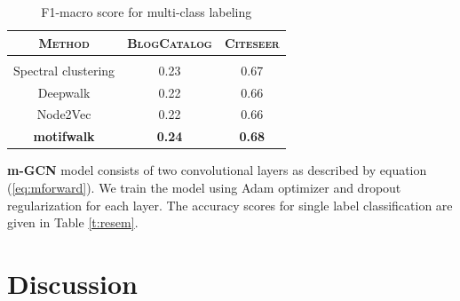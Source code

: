 \documentclass{article}
\theoremstyle{definition}
\begin{document}
\begin{table}
\centering
\begin{tabular}{c | c c}
\textbf{\textsc{Method}} & \textsc{BlogCatalog} & \textsc{Citeseer} \\
\hline \\
Spectral clustering & 0.23 & 0.67\\
Deepwalk & 0.22 & 0.66\\
Node2Vec & 0.22 & 0.66\\
\textbf{motifwalk} & \textbf{0.24} & \textbf{0.68}\\
\end{tabular}%
\caption{F1-macro score for multi-class labeling}
\label{t:re}
\end{table}

\textbf{m-GCN} model consists of two convolutional layers as described by
equation (\ref{eq:mforward}). We train the model using Adam \cite{adam} optimizer
and dropout regularization for each layer. The accuracy scores for single label
classification are given in Table \ref{t:resem}.

\begin{table}
\centering
{}
\setlength{\belowcaptionskip}{-10pt}
\caption{Accuracy score for multi-class labeling}
\label{t:resem}
\end{table}

\section{Discussion}
\end{document}

